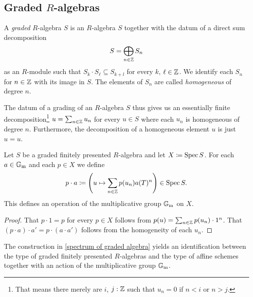 \subsection{Graded $R$-algebras}

\begin{definition}
  A \emph{graded} $R$-algebra $S$ is an $R$-algebra $S$ together with the datum of a direct sum decomposition
  \begin{equation*}
    S = \bigoplus_{n \in \mathbb{Z}} S_n
  \end{equation*}
  as an $R$-module such that $S_k \cdot S_\ell \subseteq S_{k + l}$
  for every $k$, $\ell \in \mathbb{Z}$.  We identify each $S_n$ for $n \in \mathbb{Z}$
  with its image in $S$.  The elements of $S_n$ are called \emph{homogeneous} of degree $n$.
\end{definition}

\begin{remark}
  The datum of a grading of an $R$-algebra $S$ thus gives us an
  essentially finite decomposition\footnote{That means there merely
    are $i$, $j :\mathbb{Z}$ such that $u_n = 0$ if $n < i$ or $n > j$.}
  $u = \sum_{n \in \mathbb{Z}} u_n$ for every $u \in S$ where each $u_n$ is
  homogeneous of degree $n$.  Furthermore, the decomposition of a
  homogeneous element $u$ is just $u = u$.
\end{remark}

\begin{proposition}\label{spectrum of graded algebra}
  Let $S$ be a graded finitely presented $R$-algebra and let
  $X \coloneqq \operatorname{Spec} S$.  For each $a \in \mathbb{G}_\mathrm{m}$ and each $p \in X$ we
  define
  \begin{equation*}
    p \cdot a \coloneqq \left(u \mapsto \sum_{n \in \mathbb{Z}} p(u_n) a(T)^n\right) \in \operatorname{Spec} S.
  \end{equation*}
  This defines an operation of the multiplicative group $\mathbb{G}_\mathrm{m}$ on $X$.
\end{proposition}

\begin{proof}
  That $p \cdot 1 = p$ for every $p \in X$ follows from
  $p(u) = \sum_{n \in \mathbb{Z}} p(u_n)\cdot 1^n$.  That
  $(p \cdot a) \cdot a' = p \cdot (a \cdot a')$ follows from the
  homogeneity of each $u_n$.
\end{proof}

\begin{theorem}
  The construction in \cref{spectrum of graded algebra} yields an
  identification between the type of graded finitely presented
  $R$-algebras and the type of affine schemes together with an action
  of the multiplicative group $\mathbb{G}_\mathrm{m}$.
\end{theorem}

